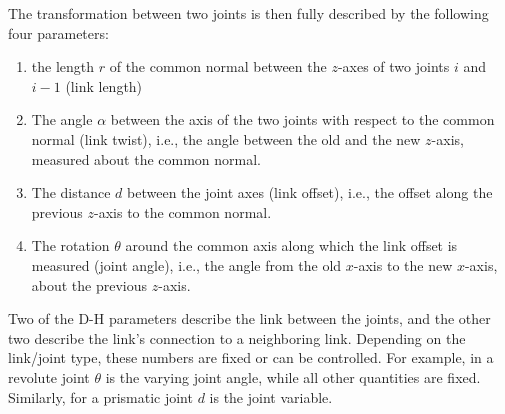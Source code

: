 The transformation between two joints is then fully described by the following four parameters:
\begin{enumerate}
\item the length $ r$ of the common normal between the $z$-axes of two joints $i$ and $i-1$ (link length)
\item The angle $ \alpha$ between the axis of the two joints with respect to the common normal (link twist), i.e., the angle between the old and the new $z$-axis, measured about the common normal.
\item The distance $d$ between the joint axes (link offset), i.e., the offset along the previous $z$-axis to the common normal.
\item The rotation $ \theta$ around the common axis along which the link offset is measured (joint angle), i.e., the angle from the old $x$-axis to the new $x$-axis, about the previous $z$-axis.
\end{enumerate}

Two of the D-H parameters describe the link between the joints, and the other two describe the link's connection to a neighboring link. Depending on the link/joint type, these numbers are fixed or can be controlled. For example, in a revolute joint $ \theta$ is the varying joint angle, while all other quantities are fixed.  Similarly, for a prismatic joint $ d$ is the joint variable.

